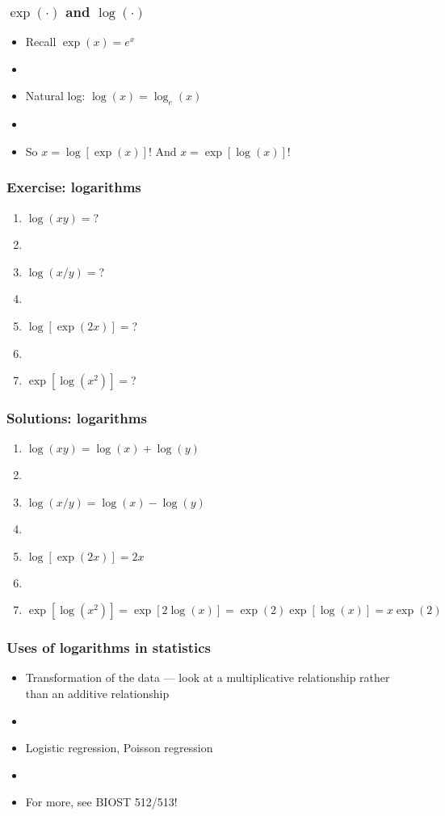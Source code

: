 \documentclass[12pt]{beamer}
\newcommand{\myframe}[1]{\begin{frame} \frametitle{#1}}
\begin{document}
\myframe{$\exp(\cdot)$ and $\log(\cdot)$}
\begin{itemize}
\item Recall $\exp(x) = e^x$
\item[]
\item Natural log: $\log (x) = \log_e(x)$
\item[]
\item So $x = \log [\exp(x)]$! And $x = \exp[\log(x)]$!
\end{itemize}
\end{frame}

\myframe{Exercise: logarithms}
\begin{enumerate}
\item $\log(xy) = $?
\item[]
\item $\log(x/y) = $?
\item[]
\item $\log[\exp(2x)] = $?
\item[]
\item $\exp[\log(x^2)] = $?
\end{enumerate}
\end{frame}

\myframe{Solutions: logarithms}
\begin{enumerate}
\item $\log(xy) = \log(x) + \log(y)$
\item[]
\item $\log(x/y) = \log(x) - \log(y)$
\item[]
\item $\log[\exp(2x)] = 2x$
\item[]
\item $\exp[\log(x^2)] = \exp[2\log(x)] = \exp(2)\exp[\log(x)] = x\exp(2)$
\end{enumerate}
\end{frame}

\myframe{Uses of logarithms in statistics}
\begin{itemize}
\item Transformation of the data --- look at a multiplicative relationship rather than an additive relationship
\item[]
\item Logistic regression, Poisson regression
\item[]
\item For more, see BIOST 512/513!
\end{itemize}
\end{frame}
\end{document}
